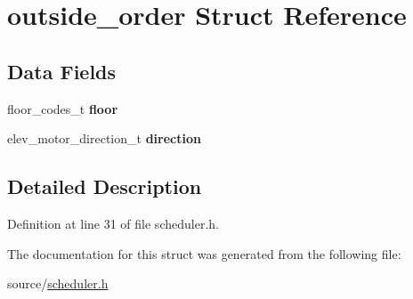 \hypertarget{structoutside__order}{}\section{outside\+\_\+order Struct Reference}
\label{structoutside__order}
\subsection*{Data Fields}
\begin{DoxyCompactItemize}
\item 
\mbox{\label{structoutside__order_a46a26592b06dc0c6c95462014a8087c2}} 
floor\+\_\+codes\+\_\+t {\bfseries floor}
\item 
\mbox{\label{structoutside__order_a542a2b3f86ab377e9cff750de95e1fe3}} 
elev\+\_\+motor\+\_\+direction\+\_\+t {\bfseries direction}
\end{DoxyCompactItemize}


\subsection{Detailed Description}


Definition at line 31 of file scheduler.\+h.



The documentation for this struct was generated from the following file\+:\begin{DoxyCompactItemize}
\item 
source/\hyperlink{scheduler_8h}{scheduler.\+h}\end{DoxyCompactItemize}

